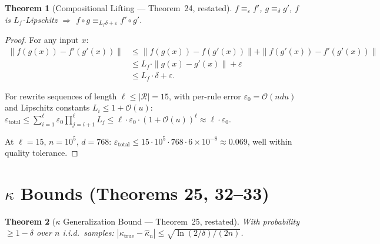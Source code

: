 \documentclass{article}
\newtheorem{theorem}{Theorem}
\theoremstyle{definition}
\theoremstyle{remark}
\newcommand{\BigO}{\mathcal{O}}
\begin{document}
\begin{theorem}[Compositional Lifting --- Theorem~24, restated]\label{thm:compositional-app}
$f \equiv_\varepsilon f'$, $g \equiv_\delta g'$, $f$ is $L_f$-Lipschitz $\Rightarrow$ $f \circ g \equiv_{L_f \delta + \varepsilon} f' \circ g'$.
\end{theorem}

\begin{proof}
For any input $x$:
\begin{align*}
\|f(g(x)) - f'(g'(x))\| &\leq \|f(g(x)) - f(g'(x))\| + \|f(g'(x)) - f'(g'(x))\| \\
&\leq L_f \cdot \|g(x) - g'(x)\| + \varepsilon \\
&\leq L_f \cdot \delta + \varepsilon.
\end{align*}

For rewrite sequences of length $\ell \leq |\mathcal{R}| = 15$, with per-rule error $\varepsilon_0 = \BigO(ndu)$ and Lipschitz constants $L_i \leq 1 + \BigO(u)$:
$\varepsilon_{\text{total}} \leq \sum_{i=1}^\ell \varepsilon_0 \prod_{j=i+1}^\ell L_j \leq \ell \cdot \varepsilon_0 \cdot (1+\BigO(u))^\ell \approx \ell \cdot \varepsilon_0$.

At $\ell = 15$, $n = 10^5$, $d = 768$: $\varepsilon_{\text{total}} \leq 15 \cdot 10^5 \cdot 768 \cdot 6 \times 10^{-8} \approx 0.069$, well within quality tolerance.
\end{proof}

\section{$\kappa$ Bounds (Theorems 25, 32--33)}\label{app:kappa-proofs}

\begin{theorem}[$\kappa$ Generalization Bound --- Theorem~25, restated]\label{thm:kappa-app}
With probability $\geq 1-\delta$ over $n$ i.i.d.\ samples:
$|\kappa_{\mathrm{true}} - \hat{\kappa}_n| \leq \sqrt{\ln(2/\delta)/(2n)}$.
\end{theorem}
\end{document}
